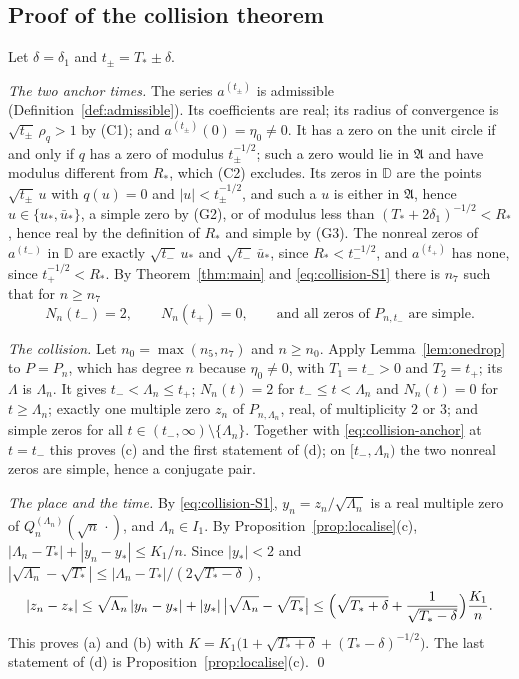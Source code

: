 \documentclass[11pt]{amsart}
\theoremstyle{definition}
\theoremstyle{remark}
\numberwithin{equation}{section}
\newcommand{\D}{\mathbb{D}}
\begin{document}
\subsection{Proof of the collision theorem}\label{subsec:collision-proof}
Let $\delta=\delta_1$ and $t_\pm=T_*\pm\delta$.

\emph{The two anchor times.} The series $a^{(t_\pm)}$ is admissible (Definition~\ref{def:admissible}). Its coefficients are real; its radius of convergence is $\sqrt{t_\pm}\,\rho_q>1$ by (C1); and $a^{(t_\pm)}(0)=\eta_0\ne0$. It has a zero on the unit circle if and only if $q$ has a zero of modulus $t_\pm^{-1/2}$; such a zero would lie in $\mathfrak A$ and have modulus different from $R_*$, which (C2) excludes. Its zeros in $\D$ are the points $\sqrt{t_\pm}\,u$ with $q(u)=0$ and $|u|<t_\pm^{-1/2}$, and such a $u$ is either in $\mathfrak A$, hence $u\in\{u_*,\bar u_*\}$, a simple zero by (G2), or of modulus less than $(T_*+2\delta_1)^{-1/2}<R_*$, hence real by the definition of $R_*$ and simple by (G3). The nonreal zeros of $a^{(t_-)}$ in $\D$ are exactly $\sqrt{t_-}\,u_*$ and $\sqrt{t_-}\,\bar u_*$, since $R_*<t_-^{-1/2}$, and $a^{(t_+)}$ has none, since $t_+^{-1/2}<R_*$. By Theorem~\ref{thm:main} and \eqref{eq:collision-S1} there is $n_7$ such that for $n\ge n_7$
\begin{equation}\label{eq:collision-anchor}
N_n(t_-)=2,\qquad N_n(t_+)=0,\qquad\text{and all zeros of }P_{n,t_-}\text{ are simple.}
\end{equation}

\emph{The collision.} Let $n_0=\max(n_5,n_7)$ and $n\ge n_0$. Apply Lemma~\ref{lem:onedrop} to $P=P_n$, which has degree $n$ because $\eta_0\ne0$, with $T_1=t_->0$ and $T_2=t_+$; its $\Lambda$ is $\Lambda_n$. It gives $t_-<\Lambda_n\le t_+$; $N_n(t)=2$ for $t_-\le t<\Lambda_n$ and $N_n(t)=0$ for $t\ge\Lambda_n$; exactly one multiple zero $z_n$ of $P_{n,\Lambda_n}$, real, of multiplicity $2$ or $3$; and simple zeros for all $t\in(t_-,\infty)\setminus\{\Lambda_n\}$. Together with \eqref{eq:collision-anchor} at $t=t_-$ this proves (c) and the first statement of (d); on $[t_-,\Lambda_n)$ the two nonreal zeros are simple, hence a conjugate pair.

\emph{The place and the time.} By \eqref{eq:collision-S1}, $y_n=z_n/\sqrt{\Lambda_n}$ is a real multiple zero of $Q_n^{(\Lambda_n)}(\sqrt n\,\cdot)$, and $\Lambda_n\in I_1$. By Proposition~\ref{prop:localise}(c), $|\Lambda_n-T_*|+|y_n-y_*|\le K_1/n$. Since $|y_*|<2$ and $|\sqrt{\Lambda_n}-\sqrt{T_*}|\le|\Lambda_n-T_*|/(2\sqrt{T_*-\delta})$,
\[
|z_n-z_*|\le\sqrt{\Lambda_n}\,|y_n-y_*|+|y_*|\,\bigl|\sqrt{\Lambda_n}-\sqrt{T_*}\bigr|\le\Bigl(\sqrt{T_*+\delta}+\frac1{\sqrt{T_*-\delta}}\Bigr)\frac{K_1}n .
\]
This proves (a) and (b) with $K=K_1\bigl(1+\sqrt{T_*+\delta}+(T_*-\delta)^{-1/2}\bigr)$. The last statement of (d) is Proposition~\ref{prop:localise}(c). \qed
\end{document}
